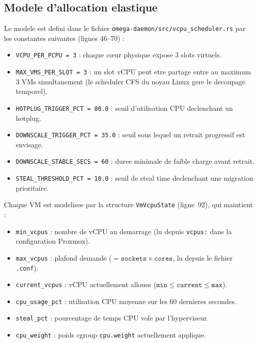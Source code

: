 \subsection{Modele d'allocation elastique}
\label{subsec:modele-vcpu}

Le modele est defini dans le fichier \texttt{omega-daemon/src/vcpu\_scheduler.rs} par les constantes suivantes (lignes 46--70) :

\begin{itemize}
    \item \texttt{VCPU\_PER\_PCPU = 3} : chaque cœur physique expose 3 slots virtuels.
    \item \texttt{MAX\_VMS\_PER\_SLOT = 3} : un slot vCPU peut etre partage entre au maximum 3 VMs simultanement (le scheduler CFS du noyau Linux gere le decoupage temporel).
    \item \texttt{HOTPLUG\_TRIGGER\_PCT = 80.0} : seuil d'utilisation CPU declenchant un hotplug.
    \item \texttt{DOWNSCALE\_TRIGGER\_PCT = 35.0} : seuil sous lequel un retrait progressif est envisage.
    \item \texttt{DOWNSCALE\_STABLE\_SECS = 60} : duree minimale de faible charge avant retrait.
    \item \texttt{STEAL\_THRESHOLD\_PCT = 10.0} : seuil de steal time declenchant une migration prioritaire.
\end{itemize}

Chaque VM est modelisee par la structure \texttt{VmVcpuState} (ligne~92), qui maintient :

\begin{itemize}
    \item \texttt{min\_vcpus} : nombre de vCPU au demarrage (lu depuis \texttt{vcpus:} dans la configuration Proxmox).
    \item \texttt{max\_vcpus} : plafond demande ($= \texttt{sockets} \times \texttt{cores}$, lu depuis le fichier \texttt{.conf}).
    \item \texttt{current\_vcpus} : vCPU actuellement alloues ($\texttt{min} \leq \texttt{current} \leq \texttt{max}$).
    \item \texttt{cpu\_usage\_pct} : utilisation CPU moyenne sur les 60 dernieres secondes.
    \item \texttt{steal\_pct} : pourcentage de temps CPU vole par l'hyperviseur.
    \item \texttt{cpu\_weight} : poids cgroup \texttt{cpu.weight} actuellement applique.
\end{itemize}

